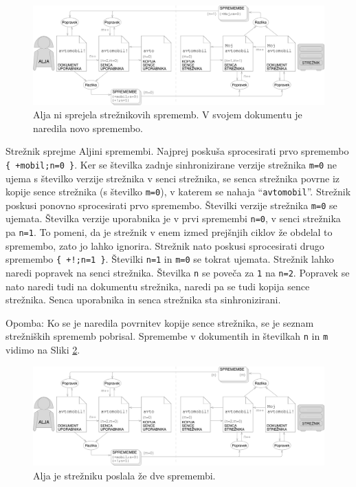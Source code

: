 \documentclass[a4paper, 12pt, twoside]{book}
\begin{document}
\begin{figure}[placement h]
\begin{center}
\includegraphics[width=16cm]{img/ds7.pdf}
\end{center}
\caption{Alja ni sprejela strežnikovih sprememb. V svojem dokumentu je naredila novo spremembo.}
\label{ds7}
\end{figure}

Strežnik sprejme Aljini spremembi. Najprej poskuša sprocesirati prvo spremembo {\tt \{ +mobil;n=0 \}}. Ker se številka zadnje sinhronizirane verzije strežnika {\tt m=0} ne ujema s številko verzije strežnika v senci strežnika, se senca strežnika povrne iz kopije sence strežnika (s številko {\tt m=0}), v katerem se nahaja “{\tt avtomobil}”. Strežnik poskusi ponovno sprocesirati prvo spremembo. Številki verzije strežnika {\tt m=0} se ujemata. Številka verzije uporabnika je v prvi spremembi {\tt n=0}, v senci strežnika pa {\tt n=1}. To pomeni, da je strežnik v enem izmed prejšnjih ciklov že obdelal to spremembo, zato jo lahko ignorira. Strežnik nato poskusi sprocesirati drugo spremembo {\tt \{ +!;n=1 \}}. Številki {\tt n=1} in {\tt m=0} se tokrat ujemata. Strežnik lahko naredi popravek na senci strežnika. Številka {\tt n} se poveča za {\tt 1} na {\tt n=2}. Popravek se nato naredi tudi na dokumentu strežnika, naredi pa se tudi kopija sence strežnika. Senca uporabnika in senca strežnika sta sinhronizirani.

Opomba: Ko se je naredila povrnitev kopije sence strežnika, se je seznam strežniških sprememb pobrisal. Spremembe v dokumentih in številkah {\tt n} in {\tt m} vidimo na Sliki \ref{ds8}.

\begin{figure}[placement h]
\begin{center}
\includegraphics[width=16cm]{img/ds8.pdf}
\end{center}
\caption{Alja je strežniku poslala že dve spremembi.}
\label{ds8}
\end{figure}
\end{document}
